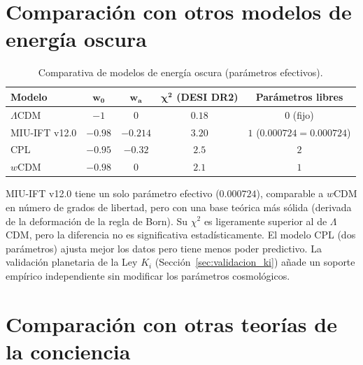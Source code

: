 \documentclass[12pt, a4paper]{article}
\theoremstyle{miuThm}
\theoremstyle{remark}
\newcommand{\eps}{0.000724}
\begin{document}

\clearpage
\section{Comparación con otros modelos de energía oscura}

\begin{table}[h!]
\centering
\caption{Comparativa de modelos de energía oscura (parámetros efectivos).}
\label{tab:comparacion}
\begin{tabular}{lcccc}
\toprule
\textbf{Modelo} & $\mathbf{w_0}$ & $\mathbf{w_a}$ & $\mathbf{\chi^2}$ (DESI DR2) & Parámetros libres \\
\midrule
$\Lambda$CDM & $-1$ & $0$ & $0.18$ & $0$ (fijo) \\
MIU-IFT v12.0 & $-0.98$ & $-0.214$ & $3.20$ & $1$ ($\eps=0.000724$) \\
CPL & $-0.95$ & $-0.32$ & $2.5$ & $2$ \\
$w$CDM & $-0.98$ & $0$ & $2.1$ & $1$ \\
\bottomrule
\end{tabular}
\end{table}

MIU-IFT v12.0 tiene un solo parámetro efectivo ($\eps$), comparable a $w$CDM en número de grados de libertad, pero con una base teórica más sólida (derivada de la deformación de la regla de Born). Su $\chi^2$ es ligeramente superior al de $\Lambda$CDM, pero la diferencia no es significativa estadísticamente. El modelo CPL (dos parámetros) ajusta mejor los datos pero tiene menos poder predictivo. La validación planetaria de la Ley $K_i$ (Sección~\ref{sec:validacion_ki}) añade un soporte empírico independiente sin modificar los parámetros cosmológicos.

\clearpage
\section{Comparación con otras teorías de la conciencia}
\end{document}
